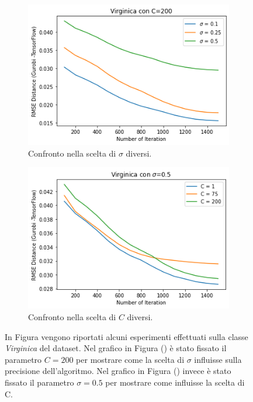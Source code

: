 \documentclass[a4paper,12pt]{report}
\begin{document}
\begin{figure}[H]
    \begin{subfigure}{0.47\textwidth}
        \centering
        \includegraphics[scale=0.5]{images/Grafici/Virginica_C200_sigmaDiversi.png}
        \caption{Confronto nella scelta di $\sigma$ diversi.}
        \label{subfig:Virginica_C200_sigmaDiversi}
    \end{subfigure}
    \begin{subfigure}{0.47\textwidth}
        \centering
        \includegraphics[scale=0.5]{images/Grafici/Virginica_Cdiversi_sigma05.png}
        \caption{Confronto nella scelta di $C$ diversi.}
        \label{subfig:Virginica_Cdiversi_sigma05}
    \end{subfigure}
    \caption{In Figura vengono riportati alcuni esperimenti effettuati sulla classe \textit{Virginica} del dataset. Nel grafico in Figura () è stato fissato il parametro $C=200$ per mostrare come la scelta di $\sigma$ influisse sulla precisione dell'algoritmo. Nel grafico in Figura () invece è stato fissato il parametro $\sigma = 0.5$ per mostrare come influisse la scelta di C.}
    \label{fig:Virginica_Preliminari}
\end{figure}
\end{document}
